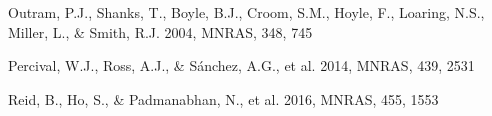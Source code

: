 \documentclass[iop]{emulateapj}
\begin{document}
\begin{thebibliography}{}




Outram, P.J., Shanks, T., Boyle, B.J., Croom, S.M., Hoyle, F., Loaring, N.S., 
Miller, L., \& Smith, R.J. 2004, MNRAS, 348, 745  









Percival, W.J., Ross, A.J., \& S\'{a}nchez, A.G., et al. 2014, MNRAS, 439, 2531






Reid, B., Ho, S., \& Padmanabhan, N., et al.  2016, MNRAS, 455, 1553


\end{thebibliography}
\end{document}
